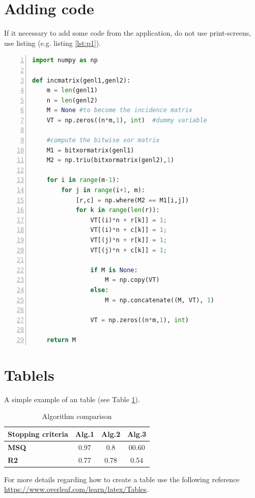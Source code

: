 \documentclass[12pt,a4paper]{book}
\theoremstyle{definition}
\theoremstyle{remark}
\begin{document}
\section{Adding code}
If it necessary to add  some code from the application, do not use print-screens, use  listing  (e.g. listing \ref{lst:p1}).
\begin{lstlisting}[language=Python, numbers=left,
    stepnumber=1, caption=Un exemplu de cod python, label=lst:p1]
import numpy as np
    
def incmatrix(genl1,genl2):
    m = len(genl1)
    n = len(genl2)
    M = None #to become the incidence matrix
    VT = np.zeros((n*m,1), int)  #dummy variable
    
    #compute the bitwise xor matrix
    M1 = bitxormatrix(genl1)
    M2 = np.triu(bitxormatrix(genl2),1) 

    for i in range(m-1):
        for j in range(i+1, m):
            [r,c] = np.where(M2 == M1[i,j])
            for k in range(len(r)):
                VT[(i)*n + r[k]] = 1;
                VT[(i)*n + c[k]] = 1;
                VT[(j)*n + r[k]] = 1;
                VT[(j)*n + c[k]] = 1;
                
                if M is None:
                    M = np.copy(VT)
                else:
                    M = np.concatenate((M, VT), 1)
                
                VT = np.zeros((n*m,1), int)
    
    return M
\end{lstlisting}

\section{Tablels}

A simple example of an table (see Table \ref{tab:my_tabel}). 

\begin{table}[!ht]
    \centering
    \begin{tabular}{|l | c |  c | c |} 
 \hline
 Stopping criteria & \textbf{Alg.1} & \textbf{Alg.2} & \textbf{Alg.3} \\  
 \hline\hline
\textbf{ MSQ} & 0.97 & 0.8 & 00.60 \\ 
 \hline
 \textbf{R2} & 0.77 & 0.78 & 0.54 \\
 \hline
 
 \hline
\end{tabular}
    \caption{Algorithm comparison}
    \label{tab:my_tabel}
\end{table}


For more details regarding how to create a table use the following reference \url{https://www.overleaf.com/learn/latex/Tables}.




\end{document}
